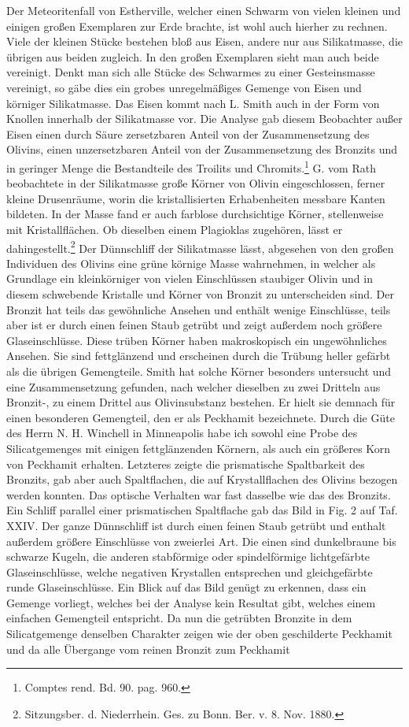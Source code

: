 \documentclass[a4paper, 12pt, oneside]{article}
\begin{document}
Der Meteoritenfall von Estherville, welcher einen Schwarm von vielen kleinen und einigen großen Exemplaren zur Erde brachte, ist wohl auch hierher zu rechnen. Viele der kleinen Stücke bestehen bloß aus Eisen, andere nur aus Silikatmasse, die übrigen aus beiden zugleich. In den großen Exemplaren sieht man auch beide vereinigt. Denkt man sich alle Stücke des Schwarmes zu einer Gesteinsmasse vereinigt, so gäbe dies ein grobes unregelmäßiges Gemenge von Eisen und körniger Silikatmasse. Das Eisen kommt nach L. Smith auch in der Form von Knollen innerhalb der Silikatmasse vor. Die Analyse gab diesem Beobachter außer Eisen einen durch Säure zersetzbaren Anteil von der Zusammensetzung des Olivins, einen unzersetzbaren Anteil von der Zusammensetzung des Bronzits und in geringer Menge die Bestandteile des Troilits und Chromits.\footnote{Comptes rend. Bd. 90. pag. 960.} G. vom Rath beobachtete in der Silikatmasse große Körner von Olivin eingeschlossen, ferner kleine Drusenräume, worin die kristallisierten Erhabenheiten messbare Kanten bildeten. In der Masse fand er auch farblose durchsichtige Körner, stellenweise mit Kristallflächen. Ob dieselben einem Plagioklas zugehören, lässt er dahingestellt.\footnote{Sitzungsber. d. Niederrhein. Ges. zu Bonn. Ber. v. 8. Nov. 1880.} Der Dünnschliff der Silikatmasse lässt, abgesehen von den großen Individuen des Olivins eine grüne körnige Masse wahrnehmen, in welcher als Grundlage ein kleinkörniger von vielen Einschlüssen staubiger Olivin und in diesem schwebende Kristalle und Körner von Bronzit zu unterscheiden sind. Der Bronzit hat teils das gewöhnliche Ansehen und enthält wenige Einschlüsse, teils aber ist er durch einen feinen Staub getrübt und zeigt außerdem noch größere Glaseinschlüsse. Diese trüben Körner haben makroskopisch ein ungewöhnliches Ansehen. Sie sind fettglänzend und erscheinen durch die Trübung heller gefärbt als die übrigen Gemengteile. Smith hat solche Körner besonders untersucht und eine Zusammensetzung gefunden, nach welcher dieselben zu zwei Dritteln aus Bronzit-, zu einem Drittel aus Olivinsubstanz bestehen. Er hielt sie demnach für einen besonderen Gemengteil, den er als Peckhamit bezeichnete. Durch die Güte des Herrn N. H. Winchell in Minneapolis habe ich sowohl eine Probe des Silicatgemenges mit einigen fettglänzenden Körnern, als auch ein größeres Korn von Peckhamit erhalten. Letzteres zeigte die prismatische Spaltbarkeit des Bronzits, gab aber auch Spaltflachen, die auf Krystallflachen des Olivins bezogen werden konnten. Das optische Verhalten war fast dasselbe wie das des Bronzits. Ein Schliff parallel einer prismatischen Spaltflache gab das Bild in Fig. 2 auf Taf. XXIV. Der ganze Dünnschliff ist durch einen feinen Staub getrübt und enthalt außerdem größere Einschlüsse von zweierlei Art. Die einen sind dunkelbraune bis schwarze Kugeln, die anderen stabförmige oder spindelförmige lichtgefärbte Glaseinschlüsse, welche negativen Krystallen entsprechen und gleichgefärbte runde Glaseinschlüsse. Ein Blick auf das Bild genügt zu erkennen, dass ein Gemenge vorliegt, welches bei der Analyse kein Resultat gibt, welches einem einfachen Gemengteil entspricht. Da nun die getrübten Bronzite in dem Silicatgemenge denselben Charakter zeigen wie der oben geschilderte Peckhamit und da alle Übergange vom reinen Bronzit zum Peckhamit 
\end{document}
